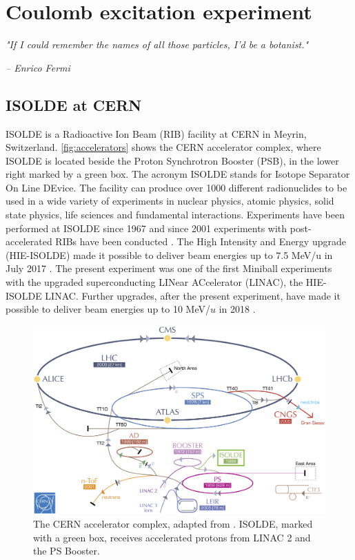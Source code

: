 \documentclass[twoside,english]{uiofysmaster/uiofysmaster}
\let\orgautoref\autoref
\renewcommand{\autoref}
        {%
		 \def\sectionautorefname{Section}%
		 \def\subsectionautorefname{Section}%
		 \def\subsubsectionautorefname{Section}%
		 \def\chapterautorefname{Chapter}%
          \orgautoref}
\begin{document}

\chapter{Coulomb excitation experiment}\label{ch:experiment}
\epigraph{\textit{"If I could remember the names of all those particles, I'd be a botanist."}}{\textit{– Enrico Fermi}}

\section{ISOLDE at CERN}
ISOLDE is a Radioactive Ion Beam (RIB) facility at CERN in Meyrin, Switzerland. \autoref{fig:accelerators} shows the CERN accelerator complex, where ISOLDE is located beside the Proton Synchrotron Booster (PSB), in the lower right marked by a green box. The acronym ISOLDE stands for Isotope Separator On Line DEvice. The facility can produce over 1000 different radionuclides to be used in a wide variety of experiments in nuclear physics, atomic physics, solid state physics, life sciences and fundamental interactions. Experiments have been performed at ISOLDE since 1967 and since 2001 experiments with post-accelerated RIBs have been conducted  \cite{HIE-ISOLDE, ISOLDE-web, ISOLDE-facility}. 
The High Intensity and Energy upgrade (HIE-ISOLDE) made it possible to deliver beam energies up to 7.5 MeV/u in July 2017 \cite{CERN-news}. 
The present experiment was one of the first Miniball experiments with the upgraded superconducting LINear ACcelerator (LINAC), the HIE-ISOLDE LINAC. 
Further upgrades, after the present experiment, have made it possible to deliver beam energies up to 10 MeV/$u$ in 2018 \cite{HIE-ISOLDE}. 

\begin{figure}[ht]
	\centering
	\includegraphics[width=\textwidth]{Images/CERN-accelerators.png}
	\caption{The CERN accelerator complex, adapted from \cite{CERN-AC}. ISOLDE, marked with a green box, receives accelerated protons from LINAC 2 and the PS Booster.}
	\label{fig:accelerators}
\end{figure}
\end{document}
